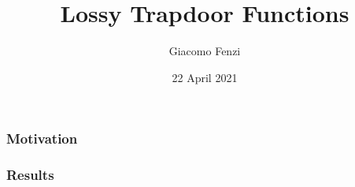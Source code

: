 \documentclass{beamer}
\title{Lossy Trapdoor Functions}
\author{Giacomo Fenzi}
\institute{ETH Zurich}
\date{22 April 2021}
\begin{document}
\frame{\titlepage}

\begin{frame}
\frametitle{Motivation}

\end{frame}


\begin{frame}
\frametitle{Results}

\end{frame}
\end{document}
